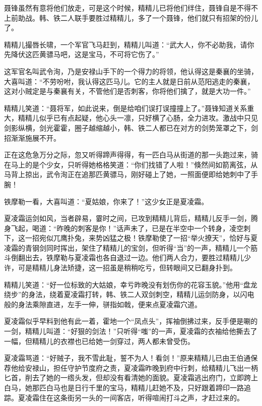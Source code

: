 \documentclass[12pt,oneside]{book}
\begin{document}
聂锋虽然有意将他们放走，可是这个时候，精精儿已将他们绊住，聂锋自是不得不上前助战。韩、铁二人联手要胜过精精儿，多了一个聂锋，他们就只有招架的份儿了。

精精儿撮唇长啸，一个军官飞马赶到，精精儿叫道：``武大人，你不必助我，请你先降伏这匹黄骠马吧，这是宝马，不可将它伤了。''

这军官名叫武令洵，乃是安禄山手下的一个得力的将领，他认得这是秦襄的坐骑，大喜叫道：``不劳吩咐，我认得这匹马儿。它的主人就是日前从范阳逃走的秦襄，这对小贼定是与秦襄有关，不管他们是否刺客，你将他们擒了，就是大功一件。''

精精儿笑道：``聂将军，如此说来，倒是给咱们误打误撞撞上了。''聂锋知道关系重大，精精儿似乎已有点起疑，他心头一凛，只好横了心肠，全力进攻。激战中只见剑影纵横，剑光霍霍，圈子越缩越小，韩、铁二人都已在对方的剑势笼罩之下，剑招渐渐施展不开。

正在这危急万分之际，忽又听得蹄声得得，有一匹白马从街道的那一头跑过来，骑在马上的是个少女，只听得她格格笑道：``你们找错了人啦！''倏然间如箭离弦，从马背上掠出，武令洵正在追那匹黄骠马，刚好碰上了她，一照面便即给她刺中了手腕！

铁摩勒一看，大喜叫道：``夏姑娘，你来了！''这少女正是夏凌霜。

夏凌霜运剑如风，当者辟易，霎时之间，已攻到精精儿背后，精精儿反手一剑，腾身飞起，喝道：``昨晚的刺客是你！''话声未了，已是在半空中一个转身，凌空刺下，这一招宛似兀鹰扑兔，来势凶猛之极！铁摩勒使了一招``举火撩天''，恰好与夏凌霜的青钢剑同时挥出，架住了精精儿的宝剑，但听得``当''的一声，精精儿一个筋斗倒翻出去，铁摩勒与夏凌霜也各自退过一边。他们两人合力，要胜过精精儿少许，可是精精儿身法矫捷，这一招虽是稍稍吃亏，但转眼间又已翻身扑到。

精精儿笑道：``好一位标致的大姑娘，幸亏昨晚没有划伤你的花容玉貌。''他用``盘龙绕步''的身法，绕着夏凌霜打转，韩、铁二人双剑刺空，精精儿运剑防身，以闪电般的身法乘隙直进，左手一伸，骈指如戟，便来点夏凌霜穴道。

夏凌霜似乎早料到他有此一着，霍地一个``凤点头''，挥袖倒拂过来，反手便是唰的一剑，精精儿叫道：``好狠的剑法！''只听得``嗤''的一声，夏凌霜的衣袖给他撕去了一幅，但精精儿的衣襟也已给她一剑穿过，两人都未曾受伤。

夏凌霜骂道：``好贼子，我不雪此耻，誓不为人！看剑！''原来精精儿已由王伯通保荐他给安禄山，担任守护节度府之责，夏凌霜昨晚到府中行刺，给精精儿飞出一柄匕首，削去了她的一绺头发，但却没有看清她的面貌。夏凌霜逃出府门，立即跨上白马，她那匹白马也是日行千里的宝马，精精儿赶她不及，只好跟着蹄印一路追踪。夏凌霜住在这条街另一头的一间客店，听得喧闹打斗之声，才赶过来的。
\end{document}
